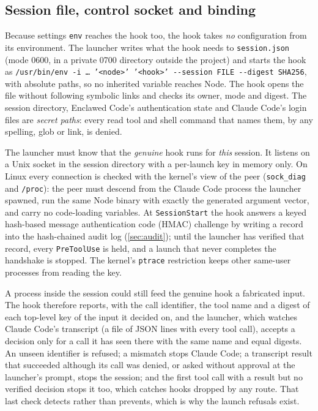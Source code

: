 \documentclass[11pt]{article}
\newcommand{\cz}{Enclawed Code}
\begin{document}
\subsection{Session file, control socket and binding}
\label{sec:session}
\label{sec:control}
\label{sec:binding}

Because settings \texttt{env} reaches the hook too, the hook takes
\emph{no} configuration from its environment. The launcher writes what
the hook needs to \texttt{session.json} (mode 0600, in a private 0700
directory outside the project) and starts the hook as
\texttt{/usr/bin/env -i \ldots{} '<node>' '<hook>' -{}-session FILE
-{}-digest SHA256}, with absolute paths, so no inherited variable reaches
Node. The hook opens the file without following symbolic links and
checks its owner, mode and digest. The session directory, \cz{}'s
authentication state and Claude Code's login files are \emph{secret
paths}: every read tool and shell command that names them, by any
spelling, glob or link, is denied.

The launcher must know that the \emph{genuine} hook runs for \emph{this}
session. It listens on a Unix socket in the session directory with a
per-launch key in memory only. On Linux every connection is checked with
the kernel's view of the peer (\texttt{sock\_diag} \cite{sockdiag,ss8} and
\texttt{/proc}): the peer must descend from the Claude Code process the
launcher spawned, run the same Node binary with exactly the generated
argument vector, and carry no code-loading variables. At
\texttt{SessionStart} the hook answers a keyed hash-based message
authentication code (HMAC) challenge by writing a record into the
hash-chained audit log (\cref{sec:audit}); until the launcher has
verified that record, every \texttt{PreToolUse} is held, and a launch
that never completes the handshake is stopped. The kernel's
\texttt{ptrace} restriction \cite{yama} keeps other same-user processes
from reading the key.

A process inside the session could still feed the genuine hook a
fabricated input. The hook therefore reports, with the call identifier,
the tool name and a digest of each top-level key of the input it decided
on, and the launcher, which watches Claude Code's transcript (a file of
JSON lines with every tool call), accepts a decision only for a call it
has seen there with the same name and equal digests. An unseen identifier
is refused; a mismatch stops Claude Code; a transcript result that
succeeded although its call was denied, or asked without approval at the
launcher's prompt, stops the session; and the first tool call with a
result but no verified decision stops it too, which catches hooks
dropped by any route. That last check detects rather than prevents,
which is why the launch refusals exist.
\end{document}
